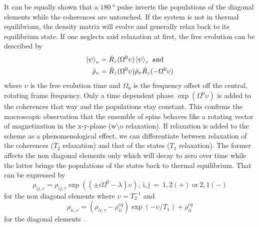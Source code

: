             It can be equally shown that a $\SI{180}{\degree}$ pulse inverts the populations of the diagonal elements while the coherences are untouched.  If the system is not in thermal equilibrium, the density matrix will evolve and generally relax back to its equilibrium state. If one neglects said relaxation at first, the free evolution can be described by
            \begin{equation}
                \begin{split}
                    \ket\psi_\upsilon &= \hat R_z(\Omega^0\upsilon)\ket\psi_\tau ~ \mathrm{and} \\
                    \hat\rho_\upsilon &= \hat R_z(\Omega^0\upsilon)\hat\rho_\tau\hat R_z(-\Omega^0\upsilon)
                \end{split}
            \end{equation}
            where $\upsilon$ is the free evolution time and $\Omega_0$ is the frequency offset off the central, rotating frame frequency. Only a time dependent phase $\exp{(\Omega^0 \upsilon)}$ is added to the coherences that way and the populations stay constant. This confirms the macroscopic observation that the ensemble of spins behaves like a rotating vector of magnetization in the x-y-plane (w\textbackslash o relaxation). If relaxation is added to the scheme as a phenomenological effect, we can differentiate between relaxation of the coherences ($T_2$ relaxation) and that of the states ($T_1$ relaxation). The former affects the non diagonal elements only which will decay to zero over time while the latter brings the populations of the states back to thermal equilibrium. That can be expressed by
            \begin{equation}
                \rho_{ij, \upsilon} = \rho_{ij, \tau} \exp{((\pm i\Omega^0-\lambda)\upsilon)},~\mathrm{i,j~=~ 1,2(+)~or~2,1(-)}
            \end{equation}
            for the non diagonal elements where $\upsilon = T_2^{-1}$ and
            \begin{equation}
                \rho_{ii,\upsilon} = (\rho_{ii,\tau} - \rho_{ii}^{eq})\exp(-\upsilon/T_1)+\rho_{ii}^{eq}
            \end{equation}
            for the diagonal elements \cite{levitt_spin_nodate}.
